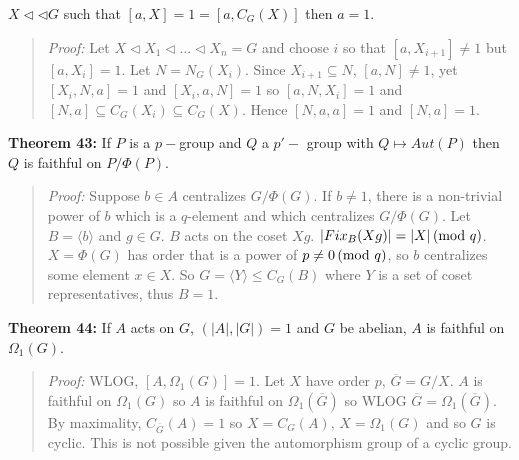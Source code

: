 $X \lhd \lhd G$ such that $[a,X]=1=[a,C_G(X)]$ then $a=1$.
\begin{quote}
\emph{Proof:}  Let $X \lhd X_1 \lhd \ldots \lhd X_n=G$ and choose $i$ so that $[a, X_{i+1}] \ne 1$ but
$[a, X_{i}] = 1$.  Let $N= N_G(X_i )$.  Since $X_{i+1} \subseteq N$, $[a,N] \ne 1$, yet
$[X_i, N, a] =1$ and
$[X_i, a, N] =1$ so
$[a, N, X_i] =1$ and $[N,a] \subseteq C_G(X_i ) \subseteq C_G(X)$.  Hence
$[N,a,a] = 1$ and $[N,a] = 1$.
\end{quote}
{\bf Theorem 43:}
If $P$ is a $p-$group and $Q$ a $p'-$ group with $Q \mapsto Aut(P)$ then
$Q$ is faithful on $P/\Phi(P)$.
\begin{quote}
\emph{Proof:}  Suppose $b \in A$ centralizes $G/\Phi(G)$.  If $b \ne 1$, there is a non-trivial
power of $b$ which is a $q$-element and which centralizes $G/ \Phi(G)$.  Let
$B= \langle b \rangle $ and $g \in G$.  $B$ acts on the coset $Xg$.  $|Fix_B(Xg)| = |X| \thinspace \textnormal{(mod } q \textnormal{)}$.
$X= \Phi(G)$ has order that is a power of $p \ne 0 \thinspace \textnormal{(mod } q \textnormal{)}$, so $b$ centralizes some
element $x \in X$.  So $G= \langle Y \rangle \le C_G(B)$ where $Y$ is a set of coset representatives,
thus $B=1$.
\end{quote}
{\bf Theorem 44:}
If $A$ acts on $G$, $(|A|,|G|)= 1$ and $G$ be abelian, $A$ is faithful on $\Omega_1(G)$.
\begin{quote}
\emph{Proof:}  WLOG, $[A, \Omega_1(G)]=1$.  Let $X$ have order $p$, ${\overline G}= G/X$.  $A$ is
faithful on $\Omega_1(G)$ so $A$ is faithful on $\Omega_1({\overline G})$ so WLOG
${\overline G}= \Omega_1({\overline G})$.  By maximality, $C_{\overline G}(A)=1$ so
$X=C_G(A)$, $X= \Omega_1(G)$ and so $G$ is cyclic.  This is not possible given the
automorphism group of a cyclic group.
\end{quote}
